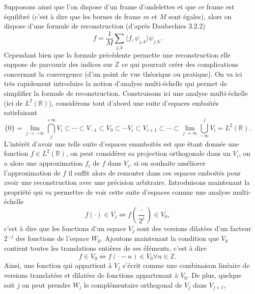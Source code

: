\newline
Supposons ainsi que l'on dispose d'un frame d'ondelettes et que ce frame est équilibré (c'est à dire que les bornes de frame $m$ et $M$ sont égales), alors on dispose d'une formule de reconstruction (d'après Daubechies 3.2.2)
\begin{equation}
	f = \frac{1}{M} \sum_{j,k} \langle f, \psi_{j,k}\rangle \psi_{j,k}.
\end{equation}
Cependant bien que la formule précédente permette une reconstruction elle suppose de parcourir des indices sur $\mathbb{Z}$ ce qui pourrait créer des complications concernant la convergence (d'un point de vue théorique ou pratique).
On va ici très rapidement introduire la notion d'analyse multi-échelle qui permet de simplifier la formule de reconstruction.
Construisons ici une analyse multi-échelle (ici de $L^2(\mathbb{R})$), considérons tout d'abord une suite d'espaces emboités satisfaisant 
\begin{equation*}
	\{0\}=	\lim_{j\to -\infty} \bigcap_{j}^{+\infty} V_i \subset \cdots \subset V_{-1} \subset V_0 \subset \cdots V_i \subset V_{i+1} \subset \cdots \subset \lim_{j\to \infty} \bigcup_{-\infty}^{j} V_i = L^2(\mathbb{R}).  
\end{equation*}
L'intérêt d'avoir une telle suite d'espaces emmboités est que étant donnée une fonction $f\in L^2(\mathbb{R})$, on peut considérer sa projection orthogonale dans un $V_i$, on a alors une approximation $f_i$ de $f$ dans $V_i$, si on souhaite améliorer l'approximation de $f$ il suffit alors de remonter dans ces espaces emboités pour avoir une reconstruction avec une précision arbitraire.
Introduisons maintenant la propriété qui va permettre de voir cette suite d'espaces comme une analyse multi-échelle
\begin{equation}
	f(\cdot) \in V_j \iff f(\frac{\cdot}{2^j}) \in V_0,
\end{equation}
c'est à dire que les fonctions d'un espace $V_j$ sont des versions dilatées d'un facteur $2^{-j}$ des fonctions de l'espace $W_0$.
Ajoutons maintenant la condition que $V_0$ contient toutes les translations entières de ses éléments, c'est à dire
\begin{equation}
	f \in V_0 \iff f(\cdot - n) \in V_0 \forall n \in \mathbb{Z}.
\end{equation}
Ainsi, une fonction qui appartient à $V_j$ s'écrit comme une combinaison linéaire de versions translatées et dilatées de fonctions appartenant à $V_0$.
De plus, quelque soit $j$ on peut prendre $W_j$ le complémentaire orthogonal de $V_j$ dans $V_{j+1}$, 
